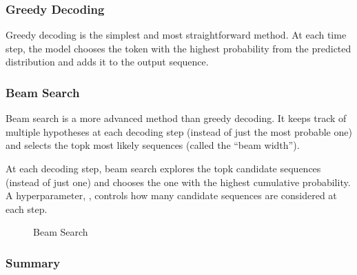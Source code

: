 \documentclass[letterpaper,11pt,english]{sphinxmanual}
\begin{document}
\subsubsection{Greedy Decoding}
\label{\detokenize{pretraining:greedy-decoding}}
\sphinxAtStartPar
Greedy decoding is the simplest and most straightforward method. At each
time step, the model chooses the token with the highest probability from
the predicted distribution and adds it to the output sequence.


\subsubsection{Beam Search}
\label{\detokenize{pretraining:beam-search}}
\sphinxAtStartPar
Beam search is a more advanced method than greedy decoding. It keeps
track of multiple hypotheses at each decoding step (instead of just the
most probable one) and selects the top\sphinxhyphen{}k most likely sequences (called
the “beam width”).

\sphinxAtStartPar
At each decoding step, beam search explores the top\sphinxhyphen{}k candidate
sequences (instead of just one) and chooses the one with the highest
cumulative probability. A hyperparameter, , controls how
many candidate sequences are considered at each step.

\begin{figure}[htbp]
\centering
\capstart

\noindent{}
\caption{Beam Search}\label{\detokenize{pretraining:id12}}\end{figure}


\subsubsection{Summary}
\label{\detokenize{pretraining:summary-1}}\label{\detokenize{pretraining:id2}}
\end{document}
